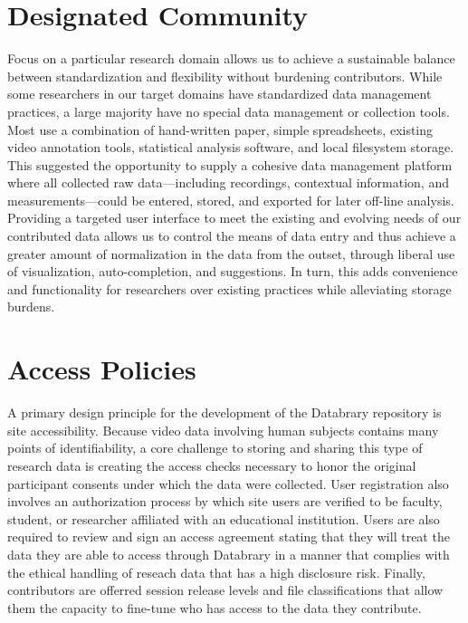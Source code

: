 \documentclass{sig-alternate}
\begin{document}
\section{Designated Community}

Focus on a particular research domain allows us to achieve a sustainable balance between standardization and flexibility without burdening contributors.
While some researchers in our target domains have standardized data management practices, a large majority have no special data management or collection tools.
Most use a combination of hand-written paper, simple spreadsheets, existing video annotation tools, statistical analysis software, and local filesystem storage.
This suggested the opportunity to supply a cohesive data management platform where all collected raw data---including recordings, contextual information, and measurements---could be entered, stored, and exported for later off-line analysis.
Providing a targeted user interface to meet the existing and evolving needs of our contributed data allows us to control the means of data entry and thus achieve a greater amount of normalization in the data from the outset, through liberal use of visualization, auto-completion, and suggestions.
In turn, this adds convenience and functionality for researchers over existing practices while alleviating storage burdens.

\section{Access Policies}

A primary design principle for the development of the Databrary repository is site accessibility. 
Because video data involving human subjects contains many points of identifiability, a core challenge to storing and sharing this type of research data is creating the access checks necessary to honor the original participant consents under which the data were collected. User registration also involves an authorization process by which site users are verified to be faculty, student, or researcher affiliated with an educational institution.
Users are also required to review and sign an access agreement stating that they will treat the data they are able to access through Databrary in a manner that complies with the ethical handling of reseach data that has a high disclosure risk.
Finally, contributors are offerred session release levels and file classifications that allow them the capacity to fine-tune who has access to the data they contribute. 
\end{document}
